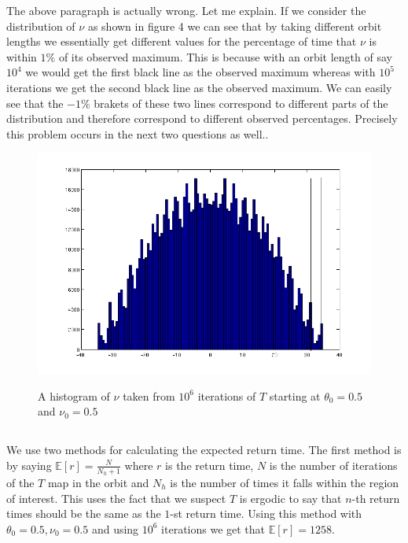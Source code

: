 \documentclass{unswmaths}
\begin{document}
The above paragraph is actually wrong. Let me explain. If we consider the distribution of $ \nu $ as shown in figure 4 we can see that by taking different orbit lengths we essentially get different values for the percentage of time that $ \nu $ is within $ 1\% $ of its observed maximum. This is because with an orbit length of say $ 10^4 $ we would get the first black line as the observed maximum whereas with $ 10^5 $ iterations we get the second black line as the observed maximum. We can easily see that the $ -1\% $ brakets of these two lines correspond to different parts of the distribution and therefore correspond to different observed percentages.
Precisely this problem occurs in the next two questions as well..


\begin{figure}[h]
    \includegraphics[scale=0.5]{nu_Histogram}
    \label{nu_Histogram}
    \caption{A histogram of $ \nu $ taken from $ 10^6 $ iterations of $ T $ starting at $ \theta_0 = 0.5 $ and $ \nu_0 = 0.5 $ }
\end{figure}

\subsection{}
We use two methods for calculating the expected return time. The first method is by saying $ \mathbb{E}[r] = \frac{N}{N_h + 1}$ where $ r $ is the return time, $ N $ is the number of iterations of the $ T $ map in the orbit and $ N_h $ is the number of times it falls within the region of interest. This uses the fact that we suspect $ T $ is ergodic to say that $ n$-th return times should be the same as the $ 1$-st return time.
Using this method with $ \theta_0 = 0.5, \nu_0 = 0.5 $ and using $ 10^6 $ iterations we get that $ \mathbb{E}[ r] = 1258 $.
\end{document}
